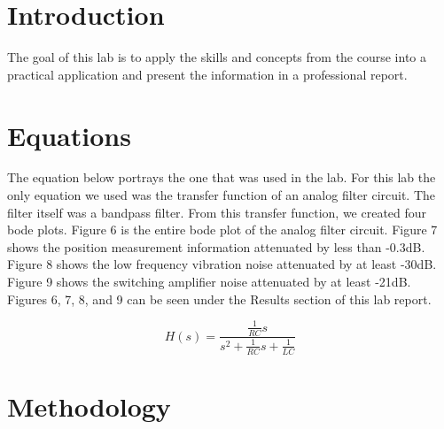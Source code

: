 \documentclass[12pt]{report}
\begin{document}
\section{Introduction}
 

The goal of this lab is to apply the skills and concepts from the course into a practical application and present the information in a professional report. 
 
   

\section{Equations}
{The equation below portrays the one that was used in the lab. For this lab the only equation we used was the transfer function of an analog filter circuit. The filter itself was a bandpass filter. From this transfer function, we created four bode plots. Figure 6 is the entire bode plot of the analog filter circuit. Figure 7 shows the position measurement information attenuated by less than -0.3dB. Figure 8 shows the low frequency vibration noise attenuated by at least -30dB. Figure 9 shows the switching amplifier noise attenuated by at least -21dB. Figures 6, 7, 8, and 9 can be seen under the Results section of this lab report. } 
 
\begin{equation}
    H(s) = \frac{\frac{1}{RC}s}{s^{2}+\frac{1}{RC}s+\frac{1}{LC}}
\end{equation}


\section{Methodology}
\end{document}
